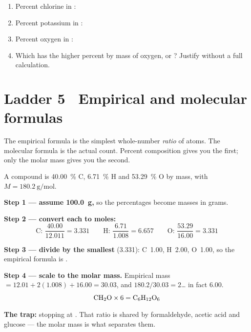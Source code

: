 \documentclass{apchem-worksheet}
\begin{document}
\begin{yourturn}
\begin{enumerate}[leftmargin=*,itemsep=0.5em]
  \item Percent chlorine in : \workspace[1.6cm]
  \item Percent potassium in : \workspace[1.6cm]
  \item Percent oxygen in : \workspace[1.6cm]
  \item Which has the higher percent by mass of oxygen,  or
        ? Justify without a full calculation.
        \workspace[1.8cm]
\end{enumerate}
\end{yourturn}

\section*{\sffamily Ladder 5 \textbullet\ Empirical and molecular formulas}

The empirical formula is the simplest whole-number \emph{ratio} of atoms.
The molecular formula is the actual count. Percent composition gives you
the first; only the molar mass gives you the second.

\begin{workedexample}
A compound is \SI{40.00}{\percent} C, \SI{6.71}{\percent} H and
\SI{53.29}{\percent} O by mass, with
$M = \SI{180.2}{\gram\per\mole}$.

\textbf{Step 1 --- assume \SI{100.0}{\gram},} so the percentages become
masses in grams.

\textbf{Step 2 --- convert each to moles:}
\[ \text{C: } \frac{40.00}{12.011} = 3.331 \qquad
   \text{H: } \frac{6.71}{1.008} = 6.657 \qquad
   \text{O: } \frac{53.29}{16.00} = 3.331 \]

\textbf{Step 3 --- divide by the smallest} (\num{3.331}):
C~1.00, H~2.00, O~1.00, so the empirical formula is \textbf{}.

\textbf{Step 4 --- scale to the molar mass.} Empirical mass
$= 12.01 + 2(1.008) + 16.00 = 30.03$, and
$180.2/30.03 = 2$\ldots{} in fact $\mathbf{6.00}$.
\[ \ce{CH2O} \times 6 = \mathbf{\ce{C6H12O6}} \]

\textbf{The trap:} stopping at . That ratio is shared by
formaldehyde, acetic acid and glucose --- the molar mass is what separates
them.
\end{workedexample}
\end{document}
